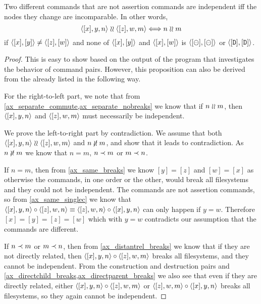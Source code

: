 \begin{mylem}
Two different commands that are not assertion commands are independent iff the nodes they change are incomparable. In other words,
\[ \langle{[x],y,n}\rangle\mathrel{\wr\wr}\langle{[z],w,m}\rangle \Longleftrightarrow n\mathrel{\wr\wr} m \]
if $\langle{[x],[y]}\rangle\neq\langle{[z],[w]}\rangle$ and none of $\langle{[x],[y]}\rangle$ and $\langle{[x],[w]}\rangle$ is $\langle{[\ominus],[\ominus]}\rangle$ or $\langle{[\mathtt{D}],[\mathtt{D}]}\rangle$.
\end{mylem}
\begin{proof}
This is easy to show based on the output of the program that investigates the behavior of command pairs.
However, this proposition can also be derived from the  already listed
in the following way.

For the right-to-left part, we note that
from \cref{ax_separate_commute,ax_separate_nobreaks} we know that
if $n\mathrel{\wr\wr} m$, then $\langle{[x],y,n}\rangle$ and $\langle{[z],w,m}\rangle$ must necessarily be independent.

We prove the left-to-right part by contradiction.
We assume that both $\langle{[x],y,n}\rangle\mathrel{\wr\wr}\langle{[z],w,m}\rangle$ and $n\nunrel m$,
and show that it leads to contradiction.
As $n\nunrel m$
we know that $n=m$, $n\prec m$ or $m\prec n$.

If $n=m$, then from \cref{ax_same_breaks} we know $[y]=[z]$ and $[w]=[x]$
as otherwise the commands, in one order or the other, would break all filesystems
and they could not be independent.
The commands are not assertion commands, so from \cref{ax_same_singlec}
we know that $\langle{[x],y,n}\rangle\circ\langle{[z],w,n}\rangle\equiv\langle{[z],w,n}\rangle\circ\langle{[x],y,n}\rangle$ can only happen if $y=w$.
Therefore $[x]=[y]=[z]=[w]$ which with $y=w$ contradicts our assumption that the commands are different.

If $n\prec m$ or $m\prec n$, then
from \cref{ax_distantrel_breaks} we know that if they are not directly related,
then $\langle{[x],y,n}\rangle\circ\langle{[z],w,m}\rangle$ breaks all filesystems, and they cannot be independent.
From the construction and destruction pairs and 
\cref{ax_directchild_breaks,ax_directparent_breaks} we also see that
even if they are directly related, either
$\langle{[x],y,n}\rangle\circ\langle{[z],w,m}\rangle$ or $\langle{[z],w,m}\rangle\circ\langle{[x],y,n}\rangle$ 
breaks all filesystems, so they again cannot be independent.
\end{proof}

